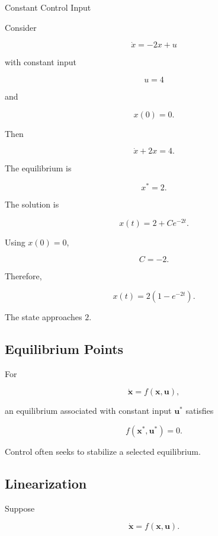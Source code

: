 \begin{workedexamplebox}{Constant Control Input}

Consider

\[
\dot{x}
=
-2x+u
\]

with constant input

\[
u=4
\]

and

\[
x(0)=0.
\]

Then

\[
\dot{x}+2x=4.
\]

The equilibrium is

\[
x^*=2.
\]

The solution is

\[
x(t)
=
2+Ce^{-2t}.
\]

Using \(x(0)=0\),

\[
C=-2.
\]

Therefore,

\begin{answerbox}
\[
\boxed{
x(t)
=
2(1-e^{-2t}).
}
\]
\end{answerbox}

The state approaches \(2\).

\end{workedexamplebox}

\subsection{Equilibrium Points}
\label{subsec:control-equilibrium-points}

For

\[
\dot{\mathbf{x}}
=
f(\mathbf{x},\mathbf{u}),
\]

an equilibrium associated with constant input \(\mathbf{u}^*\) satisfies

\[
\boxed{
f(\mathbf{x}^*,\mathbf{u}^*)=0.
}
\]

Control often seeks to stabilize a selected equilibrium.

\subsection{Linearization}
\label{subsec:control-linearization}

Suppose

\[
\dot{\mathbf{x}}
=
f(\mathbf{x},\mathbf{u}).
\]

